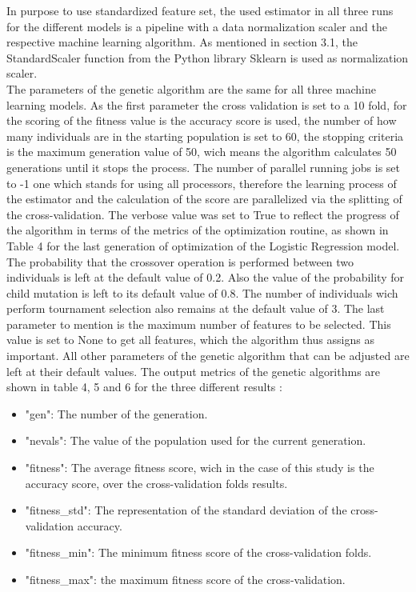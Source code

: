 \documentclass[../masterarbeit.tex]{subfiles}
\begin{document}
In purpose to use standardized feature set, the used estimator in all three runs for the different models is a pipeline with a data normalization scaler and the respective machine learning algorithm. As mentioned in section 3.1, the StandardScaler function from the Python library Sklearn is used as normalization scaler. \\







The parameters of the genetic algorithm are the same for all three machine learning models. As the first parameter the cross validation is set to a 10 fold, for the scoring of the fitness value is the accuracy score is used, the number of how many individuals are in the starting population is set to 60, the stopping criteria is the maximum generation value of 50, wich means the algorithm calculates 50 generations until it stops the process. The number of parallel running jobs is set to -1 one which stands for using all processors, therefore the learning process of the estimator and the calculation of the score are parallelized via the splitting of the cross-validation. The verbose value was set to True to reflect the progress of the algorithm in terms of the metrics of the optimization routine, as shown in Table 4 for the last generation of optimization of the Logistic Regression model. The probability that the crossover operation is performed between two individuals is left at the default value of 0.2. Also the value of the probability for child mutation is left to its default value of 0.8. The number of individuals wich perform tournament selection also remains at the default value of 3. The last parameter to mention is the maximum number of features to be selected. This value is set to None to get all features, which the algorithm thus assigns as important. All other parameters of the genetic algorithm that can be adjusted are left at their default values. \autocites{Sklearn_genetic_feature_docu:2022}
The output metrics of the genetic algorithms are shown in table 4, 5 and 6 for the three different results \textcite[]{Sklearn_genetic_feature_docu_metrics:2022}: 
\begin{itemize}
	\item "gen": The number of the generation.
	\item "nevals": The value of the population used for the current generation.
	\item "fitness": The average fitness score, wich in the case of this study is the accuracy score, over the cross-validation folds results.
	\item "fitness\_std": The representation of the standard deviation of the cross-validation accuracy.
	\item "fitness\_min": The minimum fitness score of the cross-validation folds.
	\item "fitness\_max": the maximum fitness score of the cross-validation. 
\end{itemize}
\end{document}
